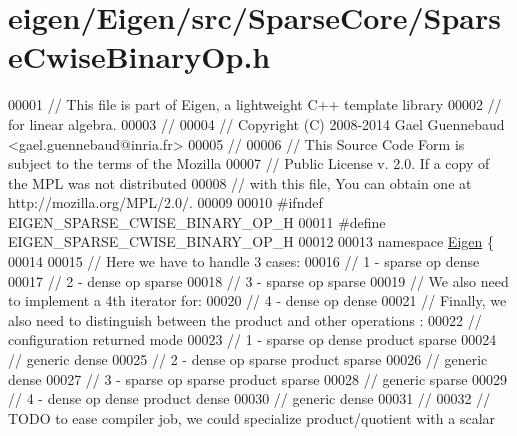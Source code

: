 \hypertarget{eigen_2_eigen_2src_2_sparse_core_2_sparse_cwise_binary_op_8h_source}{}\section{eigen/\+Eigen/src/\+Sparse\+Core/\+Sparse\+Cwise\+Binary\+Op.h}
\label{eigen_2_eigen_2src_2_sparse_core_2_sparse_cwise_binary_op_8h_source}

\begin{DoxyCode}
00001 \textcolor{comment}{// This file is part of Eigen, a lightweight C++ template library}
00002 \textcolor{comment}{// for linear algebra.}
00003 \textcolor{comment}{//}
00004 \textcolor{comment}{// Copyright (C) 2008-2014 Gael Guennebaud <gael.guennebaud@inria.fr>}
00005 \textcolor{comment}{//}
00006 \textcolor{comment}{// This Source Code Form is subject to the terms of the Mozilla}
00007 \textcolor{comment}{// Public License v. 2.0. If a copy of the MPL was not distributed}
00008 \textcolor{comment}{// with this file, You can obtain one at http://mozilla.org/MPL/2.0/.}
00009 
00010 \textcolor{preprocessor}{#ifndef EIGEN\_SPARSE\_CWISE\_BINARY\_OP\_H}
00011 \textcolor{preprocessor}{#define EIGEN\_SPARSE\_CWISE\_BINARY\_OP\_H}
00012 
00013 \textcolor{keyword}{namespace }\hyperlink{namespace_eigen}{Eigen} \{ 
00014 
00015 \textcolor{comment}{// Here we have to handle 3 cases:}
00016 \textcolor{comment}{//  1 - sparse op dense}
00017 \textcolor{comment}{//  2 - dense op sparse}
00018 \textcolor{comment}{//  3 - sparse op sparse}
00019 \textcolor{comment}{// We also need to implement a 4th iterator for:}
00020 \textcolor{comment}{//  4 - dense op dense}
00021 \textcolor{comment}{// Finally, we also need to distinguish between the product and other operations :}
00022 \textcolor{comment}{//                configuration      returned mode}
00023 \textcolor{comment}{//  1 - sparse op dense    product      sparse}
00024 \textcolor{comment}{//                         generic      dense}
00025 \textcolor{comment}{//  2 - dense op sparse    product      sparse}
00026 \textcolor{comment}{//                         generic      dense}
00027 \textcolor{comment}{//  3 - sparse op sparse   product      sparse}
00028 \textcolor{comment}{//                         generic      sparse}
00029 \textcolor{comment}{//  4 - dense op dense     product      dense}
00030 \textcolor{comment}{//                         generic      dense}
00031 \textcolor{comment}{//}
00032 \textcolor{comment}{// TODO to ease compiler job, we could specialize product/quotient with a scalar}

\end{DoxyCode}
